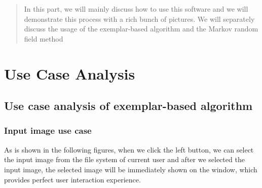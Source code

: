\begin{abstract}
In this part, we will mainly discuss how to use this software and we will demonstrate this process with a rich bunch of pictures. We will separately discuss the usage of the exemplar-based algorithm and the Markov random field method
\end{abstract}

\section{Use Case Analysis}
\subsection{Use case analysis of exemplar-based algorithm}
\subsubsection{Input image use case}
As is shown in the following figures, when we click the left button, we can select the input image from the file system of current user and after we selected the input image, the selected image will be immediately shown on the window, which provides perfect user interaction experience.

